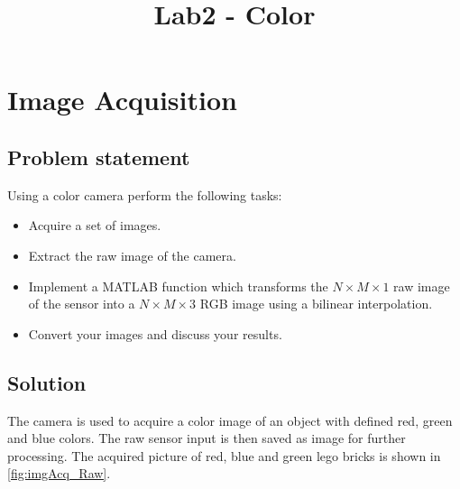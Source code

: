 \documentclass[
a4paper,     %
11pt         %
]{scrartcl}  %
\title{Lab2 - Color}
\begin{document}

 \maketitle

 \tableofcontents
 \newpage

\section{Image Acquisition}

\subsection{Problem statement}

Using a color camera perform the following tasks:

\begin{itemize}
 \item Acquire a set of images.
 \item Extract the raw image of the camera.
 \item Implement a MATLAB function which transforms the $N \times M \times 1$ raw image of the sensor into a $N \times M \times 3$ RGB image using a bilinear interpolation.
 \item Convert your images and discuss your results.
\end{itemize}

\subsection{Solution}
The camera is used to acquire a color image of an object with defined red, green and blue colors. The raw sensor input is then saved as image for further processing. The acquired picture of red, blue and green lego bricks is shown in \cref{fig:imgAcq_Raw}. 

\end{document}
